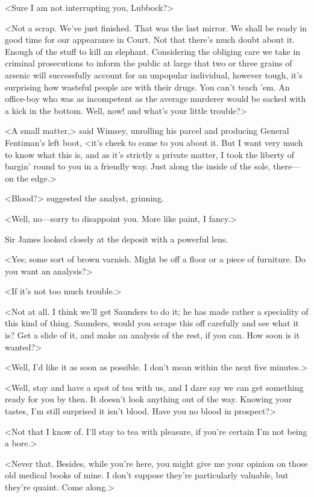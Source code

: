 <Sure I am not interrupting you, Lubbock?>

<Not a scrap. We've just finished. That was the last mirror. We shall be ready in good time for our appearance in Court. Not that there's much doubt about it. Enough of the stuff to kill an elephant. Considering the obliging care we take in criminal prosecutions to inform the public at large that two or three grains of arsenic will successfully account for an unpopular individual, however tough, it's surprising how wasteful people are with their drugs. You can't teach 'em. An office-boy who was as incompetent as the average murderer would be sacked with a kick in the bottom. Well, now! and what's your little trouble?>

<A small matter,> said Wimsey, unrolling his parcel and producing General Fentiman's left boot, <it's cheek to come to you about it. But I want very much to know what this is, and as it's strictly a private matter, I took the liberty of bargin' round to you in a friendly way. Just along the inside of the sole, there—on the edge.>

<Blood?> suggested the analyst, grinning.

<Well, no—sorry to disappoint you. More like paint, I fancy.>

Sir James looked closely at the deposit with a powerful lens.

<Yes; some sort of brown varnish. Might be off a floor or a piece of furniture. Do you want an analysis?>

<If it's not too much trouble.>

<Not at all. I think we'll get Saunders to do it; he has made rather a speciality of this kind of thing. Saunders, would you scrape this off carefully and see what it is? Get a slide of it, and make an analysis of the rest, if you can. How soon is it wanted?>

<Well, I'd like it as soon as possible. I don't mean within the next five minutes.>

<Well, stay and have a spot of tea with us, and I dare say we can get something ready for you by then. It doesn't look anything out of the way. Knowing your tastes, I'm still surprised it isn't blood. Have you no blood in prospect?>

<Not that I know of. I'll stay to tea with pleasure, if you're certain I'm not being a bore.>

<Never that. Besides, while you're here, you might give me your opinion on those old medical books of mine. I don't suppose they're particularly valuable, but they're quaint. Come along.>

